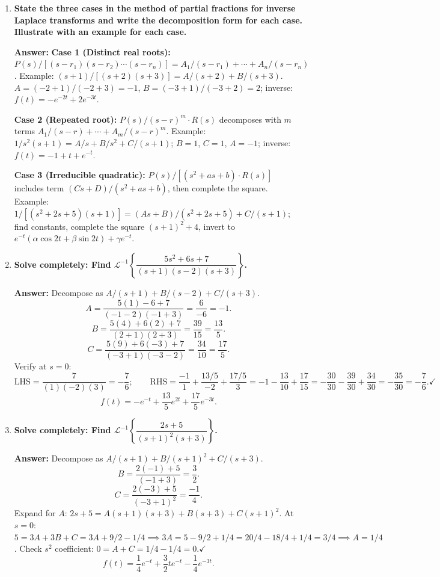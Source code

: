 \documentclass[12pt,a4paper]{article}
\begin{document}
\begin{enumerate}[label=\textbf{Q\arabic*.}, leftmargin=*, itemsep=1em]

\item \textbf{State the three cases in the method of partial fractions for
  inverse Laplace transforms and write the decomposition form for each case.
  Illustrate with an example for each case.}

  \textbf{Answer:}
  \textbf{Case 1 (Distinct real roots):} $P(s)/[(s-r_1)(s-r_2)\cdots(s-r_n)]
  = A_1/(s-r_1)+\cdots+A_n/(s-r_n)$.
  Example: $(s+1)/[(s+2)(s+3)] = A/(s+2)+B/(s+3)$.
  $A=(-2+1)/(-2+3)=-1$, $B=(-3+1)/(-3+2)=2$;
  inverse: $f(t)=-e^{-2t}+2e^{-3t}$.

  \textbf{Case 2 (Repeated root):} $P(s)/(s-r)^m \cdot R(s)$
  decomposes with $m$ terms $A_1/(s-r)+\cdots+A_m/(s-r)^m$.
  Example: $1/s^2(s+1)=A/s+B/s^2+C/(s+1)$;
  $B=1$, $C=1$, $A=-1$; inverse: $f(t)=-1+t+e^{-t}$.

  \textbf{Case 3 (Irreducible quadratic):}
  $P(s)/[(s^2+as+b)\cdot R(s)]$ includes term $(Cs+D)/(s^2+as+b)$,
  then complete the square.
  Example: $1/[(s^2+2s+5)(s+1)]=(As+B)/(s^2+2s+5)+C/(s+1)$;
  find constants, complete the square $(s+1)^2+4$, invert to
  $e^{-t}(\alpha\cos 2t+\beta\sin 2t)+\gamma e^{-t}$.

\item \textbf{Solve completely: Find
  $\mathcal{L}^{-1}\!\left\{\dfrac{5s^2+6s+7}{(s+1)(s-2)(s+3)}\right\}$.}

  \textbf{Answer:} Decompose as $A/(s+1)+B/(s-2)+C/(s+3)$.
  \[
    A = \frac{5(1)-6+7}{(-1-2)(-1+3)}=\frac{6}{-6}=-1.
  \]
  \[
    B = \frac{5(4)+6(2)+7}{(2+1)(2+3)}=\frac{39}{15}=\frac{13}{5}.
  \]
  \[
    C = \frac{5(9)+6(-3)+7}{(-3+1)(-3-2)}=\frac{34}{10}=\frac{17}{5}.
  \]
  Verify at $s=0$:
  \[
    \text{LHS} = \frac{7}{(1)(-2)(3)} = -\frac{7}{6}; \qquad
    \text{RHS} = \frac{-1}{1} + \frac{13/5}{-2} + \frac{17/5}{3}
    = -1 - \frac{13}{10} + \frac{17}{15} = -\frac{30}{30} - \frac{39}{30} + \frac{34}{30} = -\frac{35}{30} = -\frac{7}{6}.\checkmark
  \]
  \[
    f(t) = -e^{-t}+\frac{13}{5}e^{2t}+\frac{17}{5}e^{-3t}.
  \]

\item \textbf{Solve completely: Find
  $\mathcal{L}^{-1}\!\left\{\dfrac{2s+5}{(s+1)^2(s+3)}\right\}$.}

  \textbf{Answer:} Decompose as $A/(s+1)+B/(s+1)^2+C/(s+3)$.
  \[
    B = \frac{2(-1)+5}{(-1+3)}=\frac{3}{2}.
  \]
  \[
    C = \frac{2(-3)+5}{(-3+1)^2}=\frac{-1}{4}.
  \]
  Expand for $A$: $2s+5=A(s+1)(s+3)+B(s+3)+C(s+1)^2$.
  At $s=0$: $5=3A+3B+C=3A+9/2-1/4 \implies 3A=5-9/2+1/4
  =20/4-18/4+1/4=3/4 \implies A=1/4$.
  Check $s^2$ coefficient: $0=A+C=1/4-1/4=0.\checkmark$
  \[
    f(t)=\frac{1}{4}e^{-t}+\frac{3}{2}te^{-t}-\frac{1}{4}e^{-3t}.
  \]


\end{enumerate}
\end{document}
